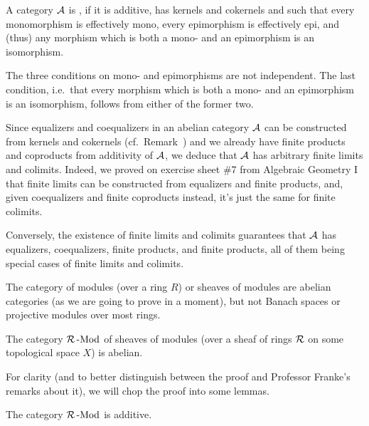 \documentclass[a4paper,parskip=half,numbers=enddot, DIV=12]{scrreprt}
\begin{document}
\begin{defi}
	A category $\mathcal{A}$ is , if it is additive, has kernels and cokernels and such that every monomorphism is effectively mono, every epimorphism is effectively epi, and (thus) any morphism which is both a mono- and an epimorphism is an isomorphism.
\end{defi}
\begin{rem*}
	\begin{alphanumerate}
		\item The three conditions on mono- and epimorphisms are not independent. The last condition, i.e.\ that every morphism which is both a mono- and an epimorphism is an isomorphism, follows from either of the former two.
		\item Since equalizers and coequalizers in an abelian category $\mathcal{A}$ can be constructed from kernels and cokernels (cf.\ Remark~) and we already have finite products and coproducts from additivity of $\mathcal{A}$, we deduce that $\mathcal{A}$ has arbitrary finite limits and colimits. Indeed, we proved on exercise sheet \#7 from Algebraic Geometry I that finite limits can be constructed from equalizers and finite products, and, given coequalizers and finite coproducts instead, it's just the same for finite colimits.
		
		Conversely, the existence of finite limits and colimits guarantees that $\mathcal{A}$ has equalizers, coequalizers, finite products, and finite products, all of them being special cases of finite limits and colimits.
	\end{alphanumerate}
	
\end{rem*}
The category of modules (over a ring $R$) or sheaves of modules are abelian categories (as we are going to prove in a moment), but not Banach spaces or projective modules over most rings.
\begin{prop}
	The category $\mathcal{R}\operatorname{-Mod}$ of sheaves of modules (over a sheaf of rings $\mathcal{R}$ on some topological space $X$) is abelian.
\end{prop}
For clarity (and to better distinguish between the proof and Professor Franke's remarks about it), we will chop the proof into some lemmas.
\begin{lem}
	The category $\mathcal{R}\operatorname{-Mod}$ is additive.
\end{lem}
\end{document}
